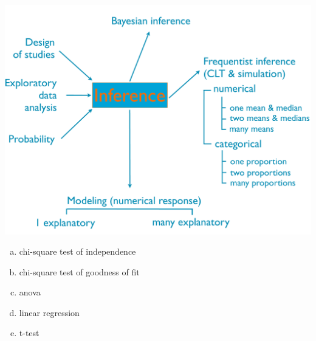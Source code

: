 \documentclass[11pt,containsverbatim,handout,xcolor=xelatex,dvipsnames,table]{beamer}
\newcommand{\solnMult}[1]{#1}
\begin{document}
\begin{frame}

{
{\scriptsize
{}}}
{
 \includegraphics[width=\textwidth]{figures/map/inference}
}

\begin{enumerate}[(a)]
\item chi-square test of independence
\item \solnMult{chi-square test of goodness of fit}
\item anova
\item linear regression
\item t-test
\end{enumerate}

\end{frame}

\end{document}
